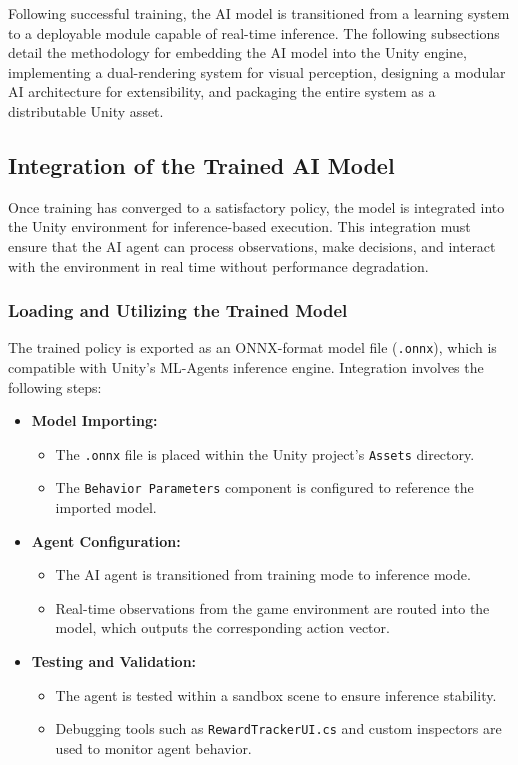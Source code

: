\documentclass[12pt,oneside,openright,a4paper]{cpe-english-project}
\begin{document}
Following successful training, the AI model is transitioned from a learning system to a deployable module capable of real-time inference. The following subsections detail the methodology for embedding the AI model into the Unity engine, implementing a dual-rendering system for visual perception, designing a modular AI architecture for extensibility, and packaging the entire system as a distributable Unity asset.\par
\subsection{Integration of the Trained AI Model}
Once training has converged to a satisfactory policy, the model is integrated into the Unity environment for inference-based execution. This integration must ensure that the AI agent can process observations, make decisions, and interact with the environment in real time without performance degradation.
\subsubsection{Loading and Utilizing the Trained Model}
The trained policy is exported as an ONNX-format model file (\texttt{.onnx}), which is compatible with Unity’s ML-Agents inference engine. Integration involves the following steps:\par
\begin{itemize}
\item \textbf{Model Importing:}
\begin{itemize}
\item The \texttt{.onnx} file is placed within the Unity project’s \texttt{Assets} directory.
\item The \texttt{Behavior Parameters} component is configured to reference the imported model.
\end{itemize}
\item \textbf{Agent Configuration:}
\begin{itemize}
\item The AI agent is transitioned from training mode to inference mode.
\item Real-time observations from the game environment are routed into the model, which outputs the corresponding action vector.
\end{itemize}
\item \textbf{Testing and Validation:}
\begin{itemize}
\item The agent is tested within a sandbox scene to ensure inference stability.
\item Debugging tools such as \texttt{RewardTrackerUI.cs} and custom inspectors are used to monitor agent behavior.
\end{itemize}
\end{itemize}
\end{document}
